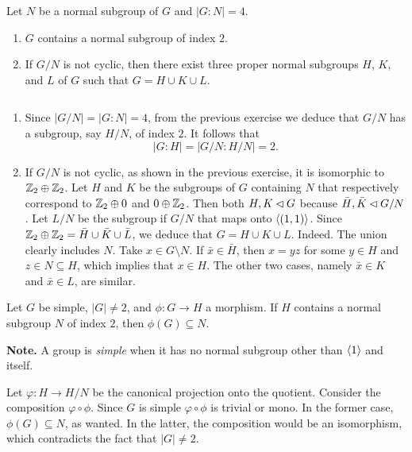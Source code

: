 \begin{exr}
    Let\/ $N$ be a normal subgroup of\/ $G$ and\/ $|G : N| = 4$.
    \begin{enumerate}[\rm a)]
        \item $G$ contains a normal subgroup of index\/ $2$.
        \item If\/ $G/N$ is not cyclic, then there exist three proper normal subgroups\/ $H$, $K$, and\/ $L$ of\/ $G$ such that\/ $G=H\cup K\cup L$.
    \end{enumerate}
\end{exr}

\begin{solution}${}$
\begin{enumerate}[\rm a)]
    \item Since $|G/N|=|G:N|=4$, from the previous exercise we deduce that $G/N$ has a subgroup, say $H/N$, of index $2$. It follows that
    $$
        |G:H|=|G/N:H/N|=2.
    $$

    \item If $G/N$ is not cyclic, as shown in the previous exercise, it is isomorphic to $\mathbb{Z}_2\oplus\mathbb{Z}_2$. Let $H$ and $K$ be the subgroups of $G$ containing $N$ that respectively correspond to $\mathbb{Z}_2\oplus 0$ and $0\oplus\mathbb{Z}_2$. Then both $H,K\lhd G$ because $\bar H,\bar K\lhd G/N$. Let $L/N$ be the subgroup if $G/N$ that maps onto $\langle(1,1)\rangle$. Since $\mathbb{Z}_2\oplus\mathbb{Z}_2=\bar H\cup\bar K\cup\bar L$, we deduce that $G=H\cup K\cup L$. Indeed. The union clearly includes $N$. Take $x\in G\setminus N$. If $\bar x\in\bar H$, then $x=yz$ for some $y\in H$ and $z\in N\subseteq H$, which implies that $x\in H$. The other two cases, namely $\bar x\in K$ and $\bar x\in L$, are similar.
\end{enumerate}
\end{solution}

\begin{exr}\label{exr:simple-group-mention}
    Let\/ $G$ be simple, $|G| \ne 2$, and\/ $\phi\colon G\to H$ a morphism. If\/ $H$ contains a normal subgroup\/ $N$ of index\/ $2$, then\/ $\phi(G) \subseteq N$.

    \textrm{\rm\textbf{Note.} A group is \textsl{simple\/} when it has no normal subgroup other than $\langle1\rangle$ and itself.}
\end{exr}

\begin{solution} Let $\varphi\colon H\to H/N$ be the canonical projection onto the quotient. Consider the composition $\varphi\circ\phi$. Since $G$ is simple $\varphi\circ\phi$ is trivial or mono. In the former case, $\phi(G)\subseteq N$, as wanted. In the latter, the composition would be an isomorphism, which contradicts the fact that $|G|\ne2$.  \end{solution}

